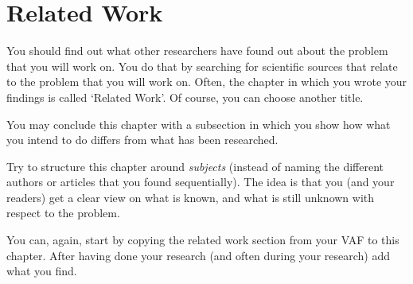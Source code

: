 \chapter{Related Work}
You should find out what other researchers have found out about the problem that you will work on. You do that by searching for scientific sources that relate to the problem that you will work on. Often, the chapter in which you wrote your findings is called `Related Work'. Of course, you can choose another title.

You may conclude this chapter with a subsection in which you show how what you intend to do differs from what has been researched.

Try to structure this chapter around \emph{subjects} (instead of naming the different authors or articles that you found sequentially). The idea is that you (and your readers) get a clear view on what is known, and what is still unknown with respect to the problem.

You can, again, start by copying the related work section from your VAF to this chapter. After having done your research (and often during your research) add what you find.
